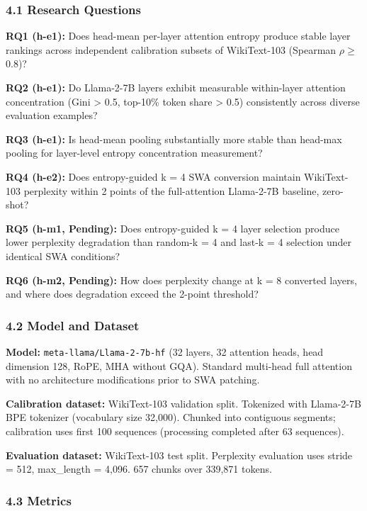 
\subsubsection{4.1 Research Questions}

\textbf{RQ1 (h-e1):} Does head-mean per-layer attention entropy produce stable layer rankings across independent calibration subsets of WikiText-103 (Spearman $\rho \geq$ 0.8)?

\textbf{RQ2 (h-e1):} Do Llama-2-7B layers exhibit measurable within-layer attention concentration (Gini > 0.5, top-10\% token share > 0.5) consistently across diverse evaluation examples?

\textbf{RQ3 (h-e1):} Is head-mean pooling substantially more stable than head-max pooling for layer-level entropy concentration measurement?

\textbf{RQ4 (h-e2):} Does entropy-guided k = 4 SWA conversion maintain WikiText-103 perplexity within 2 points of the full-attention Llama-2-7B baseline, zero-shot?

\textbf{RQ5 (h-m1, Pending):} Does entropy-guided k = 4 layer selection produce lower perplexity degradation than random-k = 4 and last-k = 4 selection under identical SWA conditions?

\textbf{RQ6 (h-m2, Pending):} How does perplexity change at k = 8 converted layers, and where does degradation exceed the 2-point threshold?

\subsubsection{4.2 Model and Dataset}

\textbf{Model:} \texttt{meta-llama/Llama-2-7b-hf} (32 layers, 32 attention heads, head dimension 128, RoPE, MHA without GQA). Standard multi-head full attention with no architecture modifications prior to SWA patching.

\textbf{Calibration dataset:} WikiText-103 validation split. Tokenized with Llama-2-7B BPE tokenizer (vocabulary size 32,000). Chunked into contiguous segments; calibration uses first 100 sequences (processing completed after 63 sequences).

\textbf{Evaluation dataset:} WikiText-103 test split. Perplexity evaluation uses stride = 512, max\_length = 4,096. 657 chunks over 339,871 tokens.

\subsubsection{4.3 Metrics}

